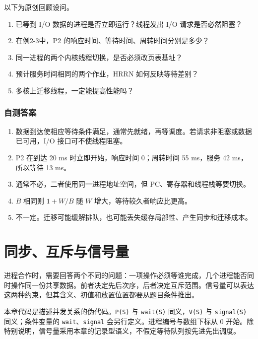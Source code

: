 以下为原创回顾设问。

\begin{enumerate}
\def\labelenumi{\arabic{enumi}.}
\tightlist
\item
  已等到 I/O 数据的进程是否立即运行？线程发出 I/O 请求是否必然阻塞？
\item
  在例2-3中，P2 的响应时间、等待时间、周转时间分别是多少？
\item
  同一进程的两个内核线程切换，是否必须改页表基址？
\item
  预计服务时间相同的两个作业，HRRN 如何反映等待差别？
\item
  多核上迁移线程，一定能提高性能吗？
\end{enumerate}

\subsection{自测答案}\label{os-c02-h258}

\begin{enumerate}
\def\labelenumi{\arabic{enumi}.}
\tightlist
\item
  数据到达使相应等待条件满足，通常先就绪，再等调度。若请求非阻塞或数据已可用，I/O 接口可不使线程阻塞。
\item
  P2 在到达 20 ms 时立即开始，响应时间 0；周转时间 55 ms，服务 42 ms，所以等待 13 ms。
\item
  通常不必，二者使用同一进程地址空间，但 PC、寄存器和线程栈等要切换。
\item
  \(B\) 相同则 \(1+W/B\) 随 \(W\) 增大，等待较久者响应比更高。
\item
  不一定。迁移可能缓解排队，也可能丢失缓存局部性、产生同步和迁移成本。
\end{enumerate}

\chapter{同步、互斥与信号量}\label{ch-sync}

进程合作时，需要回答两个不同的问题：一项操作必须等谁完成，几个进程能否同时操作同一份共享数据。前者决定先后次序，后者决定互斥范围。信号量可以表达这两种约束，但其含义、初值和放置位置都要从题目条件推出。

本章代码是描述并发关系的伪代码。\allowbreak{}\texttt{P(S)} 与 \allowbreak{}\texttt{wait(S)} 同义，\allowbreak{}\texttt{V(S)} 与 \allowbreak{}\texttt{signal(S)} 同义；条件变量的 \allowbreak{}\texttt{wait}、\allowbreak{}\texttt{signal} 会另行定义。进程编号与数组下标从 0 开始。除特别说明，信号量采用本章的记录型语义，不假定等待队列按先进先出调度。

